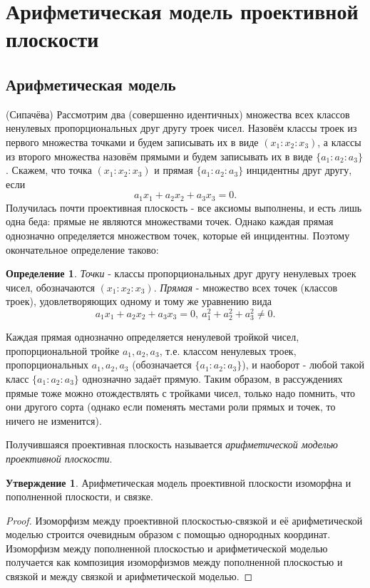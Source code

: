 \documentclass[a4paper, 12pt]{article}
\theoremstyle{definition}
\newtheorem*{definition}{Определение}
\newtheorem*{subtheorem}{Утверждение}
\begin{document}
\section{Арифметическая модель проективной плоскости}
\subsection{Арифметическая модель}
(Сипачёва) Рассмотрим два (совершенно идентичных) множества всех классов ненулевых пропорциональных друг другу троек чисел. Назовём классы троек из первого множества точками и будем записывать их в виде $(x_1:x_2:x_3)$, а классы из второго множества назовём прямыми и будем записывать их в виде $\{a_1:a_2:a_3\}$. 
Скажем, что точка $(x_1:x_2:x_3)$ и прямая $\{a_1:a_2:a_3\}$ инцидентны друг другу, если \[ a_1x_1 + a_2x_2 + a_3x_3 = 0. \]
Получилась почти проективная плоскость - все аксиомы выполнены, и есть лишь одна беда: прямые не являются множествами точек. Однако каждая прямая однозначно определяется множеством точек, которые ей инцидентны. Поэтому окончательное определение таково:

\begin{definition}
    \textit{Точки} - классы пропорциональных друг другу ненулевых троек чисел, обозначаются $(x_1:x_2:x_3)$.
    \textit{Прямая} - множество всех точек (классов троек), удовлетворяющих одному и тому же уравнению вида \[ a_1x_1 + a_2x_2 + a_3x_3 = 0, \ a_1^2 + a_2^2 + a_3^2 \neq 0. \]
\end{definition}

Каждая прямая однозначно определяется ненулевой тройкой чисел, пропорциональной тройке $a_1, a_2, a_3$, т.е. классом ненулевых троек, пропорциональных $a_1, a_2, a_3$ (обозначается $\{a_1:a_2:a_3\}$), и наоборот - любой такой класс $\{a_1:a_2:a_3\}$ однозначно задаёт прямую. Таким образом, в рассуждениях прямые тоже можно отождествлять с тройками чисел, только надо помнить, что они другого сорта (однако если поменять местами роли прямых и точек, то ничего не изменится).

Получившаяся проективная плоскость называется \textit{арифметической моделью проективной плоскости}.

\begin{subtheorem}
    Арифметическая модель проективной плоскости изоморфна и пополненной плоскости, и связке.
\end{subtheorem}
\begin{proof}
    Изоморфизм между проективной плоскостью-связкой и её арифметической моделью строится очевидным образом с помощью однородных координат. Изоморфизм между пополненной плоскостью и арифметической моделью получается как композиция изоморфизмов между пополненной плоскостью и связкой и между связкой и арифметической моделью.
\end{proof}
\end{document}
